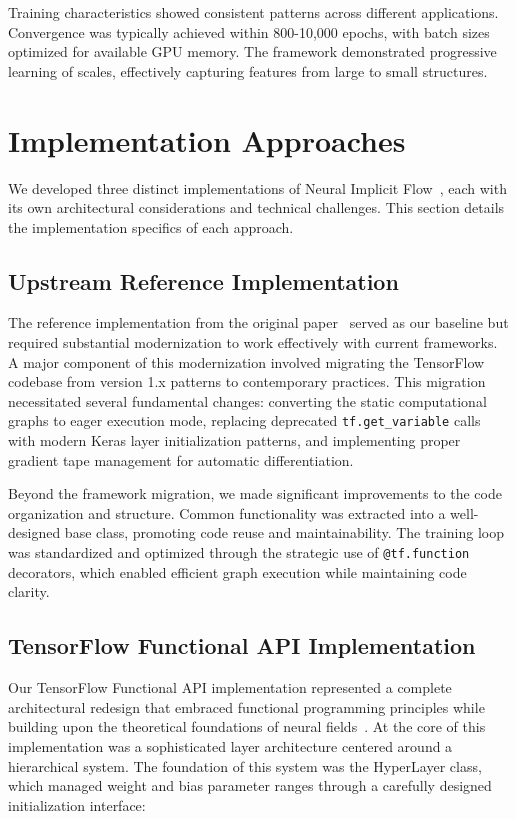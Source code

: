 \documentclass[10pt,journal,compsoc,onecolumn]{IEEEtran}
\begin{document}
Training characteristics showed consistent patterns across different applications. Convergence was typically achieved within 800-10,000 epochs, with batch sizes optimized for available GPU memory. The framework demonstrated progressive learning of scales, effectively capturing features from large to small structures.

\section{Implementation Approaches}\label{sec:implementation}
We developed three distinct implementations of Neural Implicit Flow~\cite{nif2023}, each with its own architectural considerations and technical challenges. This section details the implementation specifics of each approach.

\subsection{Upstream Reference Implementation}
The reference implementation from the original paper~\cite{nif2023} served as our baseline but required substantial modernization to work effectively with current frameworks. A major component of this modernization involved migrating the TensorFlow codebase from version 1.x patterns to contemporary practices. This migration necessitated several fundamental changes: converting the static computational graphs to eager execution mode, replacing deprecated \texttt{tf.get\_variable} calls with modern Keras layer initialization patterns, and implementing proper gradient tape management for automatic differentiation.

Beyond the framework migration, we made significant improvements to the code organization and structure. Common functionality was extracted into a well-designed base class, promoting code reuse and maintainability. The training loop was standardized and optimized through the strategic use of \texttt{@tf.function} decorators, which enabled efficient graph execution while maintaining code clarity.

\subsection{TensorFlow Functional API Implementation}
Our TensorFlow Functional API implementation represented a complete architectural redesign that embraced functional programming principles while building upon the theoretical foundations of neural fields~\cite{neural_fields2022}. At the core of this implementation was a sophisticated layer architecture centered around a hierarchical system. The foundation of this system was the HyperLayer class, which managed weight and bias parameter ranges through a carefully designed initialization interface:
\end{document}
